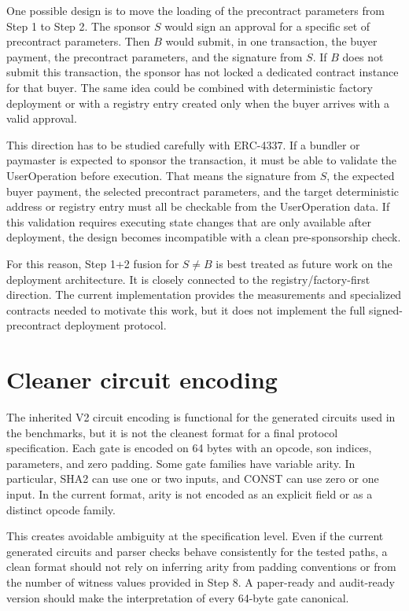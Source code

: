 One possible design is to move the loading of the precontract parameters from Step 1 to
Step 2. The sponsor \(S\) would sign an approval for a specific set of precontract
parameters. Then \(B\) would submit, in one transaction, the buyer payment, the precontract
parameters, and the signature from \(S\). If \(B\) does not submit this transaction, the
sponsor has not locked a dedicated contract instance for that buyer. The same idea could be
combined with deterministic factory deployment or with a registry entry created only when
the buyer arrives with a valid approval.

This direction has to be studied carefully with ERC-4337. If a bundler or paymaster is
expected to sponsor the transaction, it must be able to validate the UserOperation before
execution. That means the signature from \(S\), the expected buyer payment, the selected
precontract parameters, and the target deterministic address or registry entry must all be
checkable from the UserOperation data. If this validation requires executing state changes
that are only available after deployment, the design becomes incompatible with a clean
pre-sponsorship check.

For this reason, Step 1+2 fusion for \(S \neq B\) is best treated as future work on the
deployment architecture. It is closely connected to the registry/factory-first direction.
The current implementation provides the measurements and specialized contracts needed to
motivate this work, but it does not implement the full signed-precontract deployment
protocol.

\section{Cleaner circuit encoding}

The inherited V2 circuit encoding is functional for the generated circuits used in the
benchmarks, but it is not the cleanest format for a final protocol specification. Each gate
is encoded on 64 bytes with an opcode, son indices, parameters, and zero padding. Some gate
families have variable arity. In particular, SHA2 can use one or two inputs, and CONST can
use zero or one input. In the current format, arity is not encoded as an explicit field or
as a distinct opcode family.

This creates avoidable ambiguity at the specification level. Even if the current generated
circuits and parser checks behave consistently for the tested paths, a clean format should
not rely on inferring arity from padding conventions or from the number of witness values
provided in Step 8. A paper-ready and audit-ready version should make the interpretation of
every 64-byte gate canonical.

